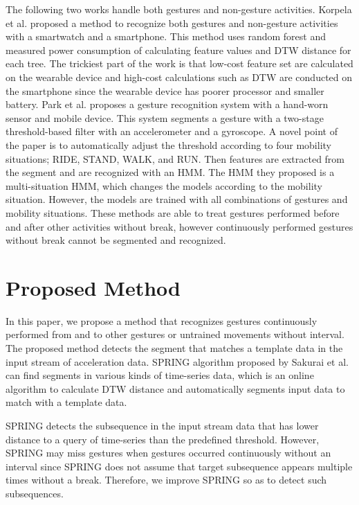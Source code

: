 \documentclass{sigchi-ext}
\begin{document}
        The following two works handle both gestures and non-gesture activities.
        Korpela et al. \cite{joseph} proposed a method to recognize both gestures and non-gesture activities with a smartwatch and a smartphone. This method uses random forest and measured power consumption of calculating feature values and DTW distance for each tree. The trickiest part of the work is that low-cost feature set are calculated on the wearable device and high-cost calculations such as DTW are conducted on the smartphone since the wearable device has poorer processor and smaller battery.
        Park et al.\cite{park} proposes a gesture recognition system with a hand-worn sensor and mobile device. This system segments a gesture with a two-stage threshold-based filter with an accelerometer and a gyroscope. A novel point of the paper is to automatically adjust the threshold according to four mobility situations; RIDE, STAND, WALK, and RUN. Then features are extracted from the segment and are recognized with an HMM. The HMM they proposed is a multi-situation HMM, which changes the models according to the mobility situation. However, the models are trained with all combinations of gestures and mobility situations. 
        These methods are able to treat gestures performed before and after other activities without break, however continuously performed gestures without break cannot be segmented and recognized.

        \section{Proposed Method}
        In this paper, we propose a method that recognizes gestures continuously performed from and to other gestures or untrained movements without interval. The proposed method detects the segment that matches a template data in the input stream of acceleration data.
        SPRING algorithm proposed by Sakurai et al. \cite{sakurai} can find segments in various kinds of time-series data, which is an online algorithm to calculate DTW distance and automatically segments input data to match with a template data.
        
        SPRING detects the subsequence in the input stream data that has lower distance to a query of time-series than the predefined threshold. However, SPRING may miss gestures when gestures occurred continuously without an interval since SPRING does not assume that target subsequence appears multiple times without a break. Therefore, we improve SPRING so as to detect such subsequences.
        
\end{document}
